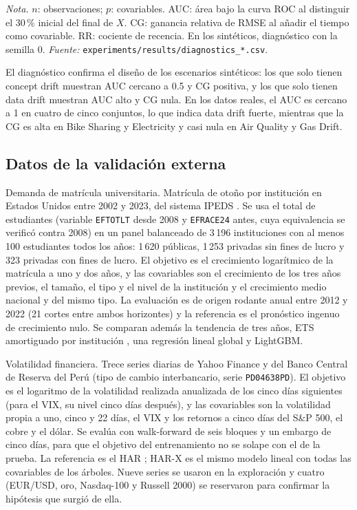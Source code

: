 \documentclass[11pt,a4paper]{article}
\newcommand{\nota}[1]{\par\smallskip\raggedright\footnotesize\textit{Nota.} #1}
\begin{document}
\begin{table}[htbp]
  \centering
  \caption{Conjuntos de datos y diagnóstico de drift}\label{tab:datasets}
  \small
  
  \nota{$n$: observaciones; $p$: covariables. AUC: área bajo la curva ROC al distinguir el 30\,\%
  inicial del final de $X$. CG: ganancia relativa de RMSE al añadir el tiempo como covariable. RR:
  cociente de recencia. En los sintéticos, diagnóstico con la semilla 0. \textit{Fuente:}
  \texttt{experiments/results/diagnostics\_*.csv}.}
\end{table}

El diagnóstico confirma el diseño de los escenarios sintéticos: los que solo tienen concept drift
muestran AUC cercano a 0.5 y CG positiva, y los que solo tienen data drift muestran AUC alto y CG
nula. En los datos reales, el AUC es cercano a 1 en cuatro de cinco conjuntos, lo que indica data
drift fuerte, mientras que la CG es alta en Bike Sharing y Electricity y casi nula en Air Quality y
Gas Drift.

\subsection{Datos de la validación externa}\label{sec:datos-externos}

Demanda de matrícula universitaria. Matrícula de otoño por institución en Estados Unidos entre 2002 y
2023, del sistema IPEDS \parencite{nces_ipeds}. Se usa el total de estudiantes (variable
\texttt{EFTOTLT} desde 2008 y \texttt{EFRACE24} antes, cuya equivalencia se verificó contra 2008) en
un panel balanceado de 3\,196 instituciones con al menos 100 estudiantes todos los años: 1\,620
públicas, 1\,253 privadas sin fines de lucro y 323 privadas con fines de lucro. El objetivo es el
crecimiento logarítmico de la matrícula a uno y dos años, y las covariables son el crecimiento de los
tres años previos, el tamaño, el tipo y el nivel de la institución y el crecimiento medio nacional y
del mismo tipo. La evaluación es de origen rodante anual entre 2012 y 2022 (21 cortes entre ambos
horizontes) y la referencia es el pronóstico ingenuo de crecimiento nulo. Se comparan además la
tendencia de tres años, ETS amortiguado por institución \parencite{gardner1985}, una regresión lineal
global y LightGBM.

Volatilidad financiera. Trece series diarias de Yahoo Finance y del Banco Central de Reserva del Perú
(tipo de cambio interbancario, serie \texttt{PD04638PD}). El objetivo es el logaritmo de la
volatilidad realizada anualizada de los cinco días siguientes (para el VIX, su nivel cinco días
después), y las covariables son la volatilidad propia a uno, cinco y 22 días, el VIX y los retornos a
cinco días del S\&P 500, el cobre y el dólar. Se evalúa con walk-forward de seis bloques y un embargo de
cinco días, para que el objetivo del entrenamiento no se solape con el de la prueba. La referencia es
el HAR \parencite{corsi2009}; HAR-X es el mismo modelo lineal con todas las covariables de los
árboles. Nueve series se usaron en la exploración y cuatro (EUR/USD, oro, Nasdaq-100 y Russell 2000)
se reservaron para confirmar la hipótesis que surgió de ella.
\end{document}
